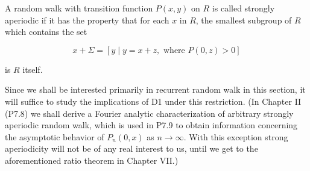 A random walk with transition function $P(x,y)$ on $R$ is called strongly aperiodic if it has the property that for each $x$ in $R$, the smallest subgroup of $R$ which contains the set

$$x + \Sigma = [y \mid y = x + z, \text{ where } P(0,z) > 0]$$

is $R$ itself.

Since we shall be interested primarily in recurrent random walk in this section, it will suffice to study the implications of D1 under this restriction. (In Chapter II (P7.8) we shall derive a Fourier analytic characterization of arbitrary strongly aperiodic random walk, which is used in P7.9 to obtain information concerning the asymptotic behavior of $P_n(0,x)$ as $n \to \infty$. With this exception strong aperiodicity will not be of any real interest to us, until we get to the aforementioned ratio theorem in Chapter VII.)